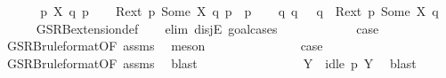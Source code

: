\begin{isabellebody}
\ \ \isamarkupfalse%
\isanewline
{}\isamarkupfalse%
\isanewline
\ \ \isamarkupfalse%
\ p\ X\ q\ p{\isacharprime}{\kern0pt}\isanewline
\ \ \isamarkupfalse%
\ {\isacartoucheopen}{\isacharquery}{\kern0pt}R{\isacharunderscore}{\kern0pt}ext\ p\ {\isacharparenleft}{\kern0pt}Some\ X{\isacharparenright}{\kern0pt}\ q{\isacartoucheclose}\ {\isacartoucheopen}p\ {\isasymlongmapsto}{\isasymtau}\ p{\isacharprime}{\kern0pt}{\isacartoucheclose}\isanewline
\ \ \isamarkupfalse%
\ {\isacartoucheopen}{\isasymexists}q{\isacharprime}{\kern0pt}{\isachardot}{\kern0pt}\ q\ {\isasymlongmapsto}{\isasymtau}\ \ q{\isacharprime}{\kern0pt}\ {\isasymand}\ {\isacharquery}{\kern0pt}R{\isacharunderscore}{\kern0pt}ext\ p{\isacharprime}{\kern0pt}\ {\isacharparenleft}{\kern0pt}Some\ X{\isacharparenright}{\kern0pt}\ q{\isacharprime}{\kern0pt}{\isacartoucheclose}\ \isanewline
\ \ \ \ \isamarkupfalse%
\ GSRB{\isacharunderscore}{\kern0pt}extension{\isacharunderscore}{\kern0pt}def\isanewline
\ \ \isamarkupfalse%
\ {\isacharparenleft}{\kern0pt}elim\ disjE{\isacharcomma}{\kern0pt}\ goal{\isacharunderscore}{\kern0pt}cases{\isacharparenright}{\kern0pt}\isanewline
\ \ \ \ \isamarkupfalse%
\ {}\isanewline
\ \ \ \ \isamarkupfalse%
\ {\isacharquery}{\kern0pt}case\ \isanewline
\ \ \ \ \ \ \isamarkupfalse%
\ GSRB{\isacharunderscore}{\kern0pt}ruleformat{\isacharparenleft}{\kern0pt}{}{\isacharparenright}{\kern0pt}{\isacharbrackleft}{\kern0pt}OF\ assms{\isacharbrackright}{\kern0pt}\ \isamarkupfalse%
\ meson\isanewline
\ \ \isamarkupfalse%
\isanewline
\ \ \ \ \isamarkupfalse%
\ {}\isanewline
\ \ \ \ \isamarkupfalse%
\ {\isacharquery}{\kern0pt}case\ \isanewline
\ \ \ \ \ \ \isamarkupfalse%
\ GSRB{\isacharunderscore}{\kern0pt}ruleformat{\isacharparenleft}{\kern0pt}{}{\isacharparenright}{\kern0pt}{\isacharbrackleft}{\kern0pt}OF\ assms{\isacharbrackright}{\kern0pt}\ \isamarkupfalse%
\ blast\isanewline
\ \ \isamarkupfalse%
\isanewline
\ \ \ \ \isamarkupfalse%
\ {}\isanewline
\ \ \ \ \isamarkupfalse%
\ \isamarkupfalse%
\ Y\ \ {\isacartoucheopen}idle\ p\ Y{\isacartoucheclose}\ \isamarkupfalse%
\ blast\isanewline
\ \ \ \ \isamarkupfalse%
\ {}{\isacharparenleft}{\kern0pt}{}{\isacharparenright}{\kern0pt}\ \isamarkupfalse%

\end{isabellebody}
